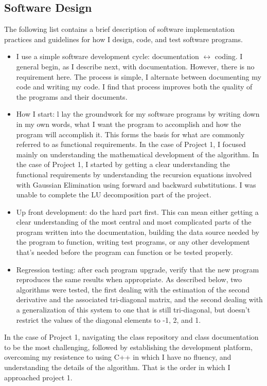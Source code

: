 \documentclass[11pt, oneside]{article}   	%
\begin{document}
\subsection{Software Design}
The following list contains a brief description of software implementation practices and guidelines for how I design, code, and test software programs.
\begin{itemize}
\item I use a simple software development cycle: documentation $\leftrightarrow$ coding. I general begin, as I describe next, with documentation. However, there is no requirement here. The process is simple, I alternate between documenting my code and writing my code. I find that process improves both the quality of the programs and their documents.
\item How I start: l lay the groundwork for my software programs by writing down in my own words, what I want the program to accomplish and how the program will accomplish it. This forms the basis for what are commonly referred to as functional requirements. In the case of Project 1, I focused mainly on understanding the mathematical development of the algorithm. In the case of Project 1,  I started by getting a clear understanding the functional requirements by understanding the recursion equations involved with Gaussian Elimination using forward and backward substitutions. I was unable to complete the LU decomposition part of the project.
\item Up front development: do the hard part first. This can mean either getting a clear understanding of the most central and most complicated parts of the program written into the documentation, building the data source needed by the program to function,  writing test programs, or any other development that's needed before the program can function or be tested properly.
\item Regression testing: after each program upgrade, verify that the new program reproduces the same results when appropriate. As described below, two algorithms were tested, the first dealing with the estimation of the second derivative and the associated tri-diagonal matrix, and the second dealing with a generalization of this system to one that is still tri-diagonal, but doesn't restrict the values of the diagonal elements to -1, 2, and 1.
\end{itemize}
In the case of Project 1, navigating the class repository and class documentation to be the most challenging, followed by establishing the development platform, overcoming my resistence to using C++ in which I have no fluency, and understanding the details of the algorithm. That is the order in which I approached project 1. \newline
\end{document}

